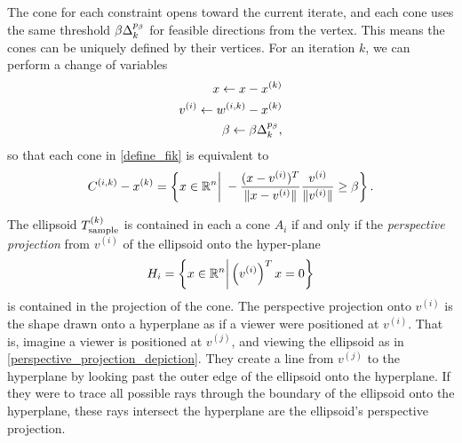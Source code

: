 




The cone for each constraint opens toward the current iterate,
and each cone uses the same threshold $\beta \Delta_k^{p_\beta}$ for feasible directions from the vertex.
This means the cones can be uniquely defined by their vertices.
For an iteration $k$, we can perform a change of variables
\begin{align}
x \gets x - x^{(k)} \\
v^{(i)}  \gets {w^{(i, k)}} - x^{(k)} \\
\beta \gets \beta \Delta_k^{p_{\beta}},
\end{align}
so that each cone in \cref{define_fik} is equivalent to
\begin{align*}
{C^{(i, k)}} - x^{(k)} = \left\{x\in\mathbb R^n\bigg|\;-\frac{(x - v^{(i)})^T}{\|x - v^{(i)}\|} \frac{v^{(i)}}{\|v^{(i)}\|} \ge \beta \right\}.
\end{align*}

The ellipsoid ${T_{\text{sample}}^{(k)}}$ is contained in each a cone $A_i$ if and only if the \emph{perspective projection} from $v^{(i)}$ of the ellipsoid onto the hyper-plane 
\begin{align*}
H_i = \left\{x \in \mathbb R^n \bigg|\left(v^{(i)}\right)^Tx = 0\right\}
\end{align*}
is contained in the projection of the cone.   
The perspective projection onto $v^{(i)}$ is the shape drawn onto a hyperplane as if a viewer were positioned at $v^{(i)}$.
That is, imagine a viewer is positioned at $v^{(j)}$, and viewing the ellipsoid as in \cref{perspective_projection_depiction}.
They create a line from $v^{(j)}$ to the hyperplane by looking past the outer edge of the ellipsoid onto the hyperplane.
If they were to trace all possible rays through the boundary of the ellipsoid onto the hyperplane, 
these rays intersect the hyperplane are the ellipsoid's perspective projection.


